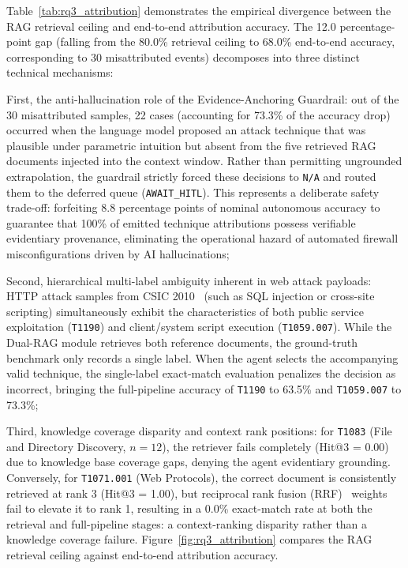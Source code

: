 Table~\ref{tab:rq3_attribution} demonstrates the empirical divergence between the RAG retrieval ceiling and end-to-end attribution accuracy. The 12.0 percentage-point gap (falling from the 80.0\% retrieval ceiling to 68.0\% end-to-end accuracy, corresponding to 30 misattributed events) decomposes into three distinct technical mechanisms:

First, the anti-hallucination role of the Evidence-Anchoring Guardrail: out of the 30 misattributed samples, 22 cases (accounting for 73.3\% of the accuracy drop) occurred when the language model proposed an attack technique that was plausible under parametric intuition but absent from the five retrieved RAG documents injected into the context window. Rather than permitting ungrounded extrapolation, the guardrail strictly forced these decisions to \texttt{N/A} and routed them to the deferred queue (\texttt{AWAIT\_HITL}). This represents a deliberate safety trade-off: forfeiting 8.8 percentage points of nominal autonomous accuracy to guarantee that 100\% of emitted technique attributions possess verifiable evidentiary provenance, eliminating the operational hazard of automated firewall misconfigurations driven by AI hallucinations;

Second, hierarchical multi-label ambiguity inherent in web attack payloads: HTTP attack samples from CSIC 2010~\cite{csic2010} (such as SQL injection or cross-site scripting) simultaneously exhibit the characteristics of both public service exploitation (\texttt{T1190}) and client/system script execution (\texttt{T1059.007}). While the Dual-RAG module retrieves both reference documents, the ground-truth benchmark only records a single label. When the agent selects the accompanying valid technique, the single-label exact-match evaluation penalizes the decision as incorrect, bringing the full-pipeline accuracy of \texttt{T1190} to 63.5\% and \texttt{T1059.007} to 73.3\%;

Third, knowledge coverage disparity and context rank positions: for \texttt{T1083} (File and Directory Discovery, $n=12$), the retriever fails completely (Hit@3 = 0.00) due to knowledge base coverage gaps, denying the agent evidentiary grounding. Conversely, for \texttt{T1071.001} (Web Protocols), the correct document is consistently retrieved at rank 3 (Hit@3 = 1.00), but reciprocal rank fusion (RRF)~\cite{rrf2009} weights fail to elevate it to rank 1, resulting in a 0.0\% exact-match rate at both the retrieval and full-pipeline stages: a context-ranking disparity rather than a knowledge coverage failure. Figure~\ref{fig:rq3_attribution} compares the RAG retrieval ceiling against end-to-end attribution accuracy.

